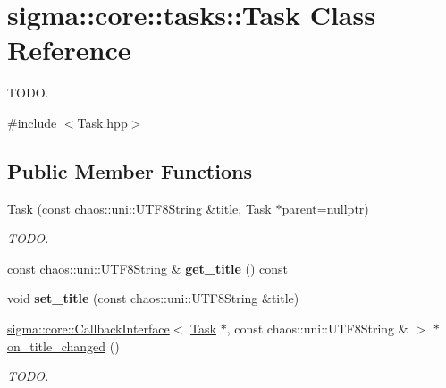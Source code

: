 \hypertarget{classsigma_1_1core_1_1tasks_1_1_task}{}\section{sigma\+:\+:core\+:\+:tasks\+:\+:Task Class Reference}
\label{classsigma_1_1core_1_1tasks_1_1_task}


T\+O\+D\+O.  




{\ttfamily \#include $<$Task.\+hpp$>$}

\subsection*{Public Member Functions}
\begin{DoxyCompactItemize}
\item 
\hyperlink{classsigma_1_1core_1_1tasks_1_1_task_a0e0bb9899317a89bf9e49bd04513bc04}{Task} (const chaos\+::uni\+::\+U\+T\+F8\+String \&title, \hyperlink{classsigma_1_1core_1_1tasks_1_1_task}{Task} $\ast$parent=nullptr)
\begin{DoxyCompactList}\small\item\em T\+O\+D\+O. \end{DoxyCompactList}\item 
\hypertarget{classsigma_1_1core_1_1tasks_1_1_task_a8fd41c73909654ee57670b45c273a65b}{}const chaos\+::uni\+::\+U\+T\+F8\+String \& {\bfseries get\+\_\+title} () const \label{classsigma_1_1core_1_1tasks_1_1_task_a8fd41c73909654ee57670b45c273a65b}

\item 
\hypertarget{classsigma_1_1core_1_1tasks_1_1_task_a1f17b3e1f7b444d6a73f5391e929adc5}{}void {\bfseries set\+\_\+title} (const chaos\+::uni\+::\+U\+T\+F8\+String \&title)\label{classsigma_1_1core_1_1tasks_1_1_task_a1f17b3e1f7b444d6a73f5391e929adc5}

\item 
\hypertarget{classsigma_1_1core_1_1tasks_1_1_task_ae954c977b0085755d73ef44073152fec}{}\hyperlink{classsigma_1_1core_1_1_callback_interface}{sigma\+::core\+::\+Callback\+Interface}$<$ \hyperlink{classsigma_1_1core_1_1tasks_1_1_task}{Task} $\ast$, const chaos\+::uni\+::\+U\+T\+F8\+String \& $>$ $\ast$ \hyperlink{classsigma_1_1core_1_1tasks_1_1_task_ae954c977b0085755d73ef44073152fec}{on\+\_\+title\+\_\+changed} ()\label{classsigma_1_1core_1_1tasks_1_1_task_ae954c977b0085755d73ef44073152fec}

\begin{DoxyCompactList}\small\item\em T\+O\+D\+O. \end{DoxyCompactList}\end{DoxyCompactItemize}
